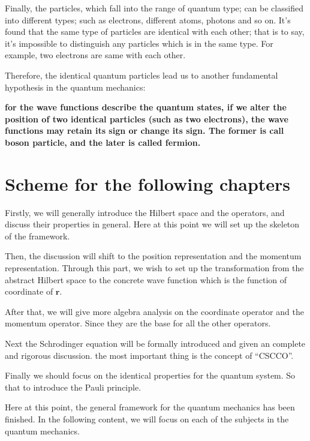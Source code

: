 Finally, the particles, which fall into the range of quantum type; can
be classified into different types; such as electrons, different
atoms, photons and so on. It's found that the same type of particles
are identical with each other; that is to say, it's impossible to
distinguish any particles which is in the same type. For example, two
electrons are same with each other.

Therefore, the identical quantum particles lead us to another
fundamental hypothesis in the quantum mechanics:
\begin{law}
\textbf{for the wave functions describe the quantum states, if we
alter the position of two identical particles (such as two
electrons), the wave functions may retain its sign or change its
sign. The former is call boson particle, and the later is called
fermion.}
\end{law}

\section{Scheme for the following chapters}
%
%
%
%
Firstly, we will generally introduce the Hilbert space and the
operators, and discuss their properties in general. Here at this
point we will set up the skeleton of the framework.

Then, the discussion will shift to the position representation and
the momentum representation. Through this part, we wish to set up
the transformation from the abstract Hilbert space to the concrete
wave function which is the function of coordinate of $\bm{r}$.

After that, we will give more algebra analysis on the coordinate
operator and the momentum operator. Since they are the base for all
the other operators.

Next the Schrodinger equation will be formally introduced and given
an complete and rigorous discussion. the most important thing is the
concept of ``CSCCO''.

Finally we should focus on the identical properties for the quantum
system. So that to introduce the Pauli principle.

Here at this point, the general framework for the quantum mechanics
has been finished. In the following content, we will focus on each
of the subjects in the quantum mechanics.

